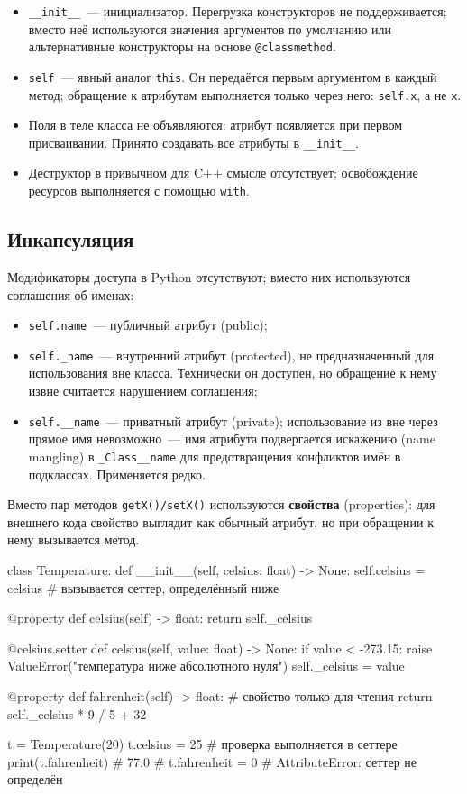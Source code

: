 \documentclass[11pt,a4paper]{article}
\newcommand{\code}[1]{\texttt{#1}}
\begin{document}
\begin{itemize}
  \item \code{\_\_init\_\_}~— инициализатор. Перегрузка конструкторов
        не поддерживается; вместо неё используются значения аргументов по умолчанию или
        альтернативные конструкторы на основе \code{@classmethod}.
  \item \code{self}~— явный аналог \code{this}. Он передаётся первым аргументом в каждый метод;
        обращение к атрибутам выполняется только через него: \code{self.x}, а не \code{x}.
  \item Поля в теле класса не объявляются: атрибут появляется при первом присваивании.
        Принято создавать все атрибуты в \code{\_\_init\_\_}.
  \item Деструктор в привычном для C++ смысле отсутствует; освобождение ресурсов выполняется
        с помощью \code{with}.
\end{itemize}

\subsection{Инкапсуляция}

Модификаторы доступа в Python отсутствуют; вместо них используются соглашения об именах:
\begin{itemize}
  \item \code{self.name}~— публичный атрибут (public);
  \item \code{self.\_name}~— внутренний атрибут (protected), не предназначенный для использования вне класса.
        Технически он доступен, но обращение к нему извне считается нарушением соглашения;
  \item \code{self.\_\_name}~— приватный атрибут (private); использование из вне через прямое имя
        невозможно~— имя атрибута подвергается искажению (name mangling) в \code{\_Class\_\_name}
        для предотвращения конфликтов имён в подклассах. Применяется редко.
\end{itemize}

Вместо пар методов \code{getX()/setX()} используются \textbf{свойства} (properties): для внешнего кода
свойство выглядит как обычный атрибут, но при обращении к нему вызывается метод.

\begin{py}
class Temperature:
    def __init__(self, celsius: float) -> None:
        self.celsius = celsius          # вызывается сеттер, определённый ниже

    @property
    def celsius(self) -> float:
        return self._celsius

    @celsius.setter
    def celsius(self, value: float) -> None:
        if value < -273.15:
            raise ValueError("температура ниже абсолютного нуля")
        self._celsius = value

    @property
    def fahrenheit(self) -> float:      # свойство только для чтения
        return self._celsius * 9 / 5 + 32


t = Temperature(20)
t.celsius = 25          # проверка выполняется в сеттере
print(t.fahrenheit)     # 77.0
# t.fahrenheit = 0      # AttributeError: сеттер не определён
\end{py}
\end{document}

